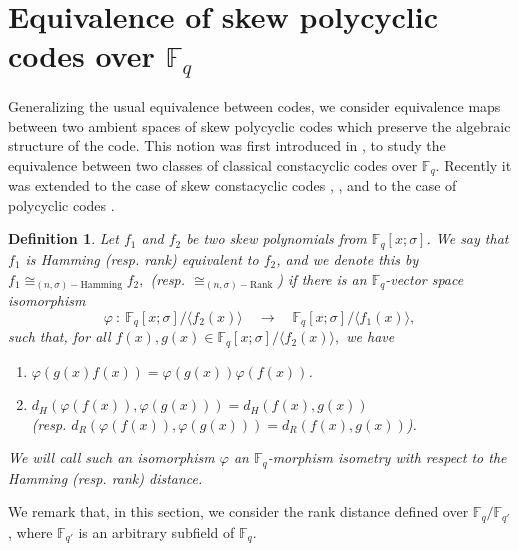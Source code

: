 \documentclass[12pt,paper]{article}
\theoremstyle{plain}
\newtheorem{definition}[theorem]{Definition}
\newcommand{\Fq}{\mathbb{F}_{q}}
\begin{document}
\section{Equivalence  of  skew  polycyclic codes over $\Fq$}

Generalizing the usual equivalence between codes, we consider equivalence maps between two ambient spaces of skew polycyclic codes which preserve the algebraic structure of the code. This notion was first introduced in \cite{Chen2012}, to study the equivalence between two classes of classical constacyclic  codes over $\Fq.$ Recently it was extended to the case of skew constacyclic codes \cite{Boulanouar2021,Ouazzou2025}, \cite[Section 6]{Lobillo2025},  and to the case of polycyclic codes \cite{Equiv2025, Chibloun2025polycyclic}.  

\begin{definition}\label{FqIso}  
Let $f_1$ and $f_2$ be two skew polynomials from $\mathbb{F}_q[x;\sigma]$. We say that $f_1$  is \emph{Hamming} (resp. \emph{rank}) \emph{equivalent} to $f_2$, and we denote this by $ f_1 \cong_{(n,\sigma)-\text{Hamming}} f_2, $ (resp. $\cong_{(n,\sigma)-\text{Rank}}$)  if there is an $\mathbb{F}_q$-vector space isomorphism 
$$\varphi ~:~  \mathbb{F}_q[x;\sigma] /\langle f_2(x)\rangle   \quad \longrightarrow  \quad  \mathbb{F}_q[x;\sigma] /\langle 
f_1(x)\rangle,$$
such that, for all $ f(x), g(x) \in \Fq[x;\sigma] /\langle f_2(x) \rangle,$ we have 
\begin{enumerate}  
    \item $\varphi(g(x)f(x))= \varphi(g(x)) \varphi(f(x)) $.  
    \item $d_H(\varphi(f(x)), \varphi(g(x)))=d_H(f(x), g(x))$ \\ (resp. $ d_R(\varphi(f(x)), \varphi(g(x)))=d_R(f(x), g(x))$).
\end{enumerate}  
We will call such an isomorphism $\varphi$ an \emph{$\mathbb{F}_q$-morphism isometry} with respect to the Hamming (resp. rank)   distance.
\end{definition}  

We remark that, in this section,  we consider the rank distance defined over $ \Fq/ \mathbb{F}_{q'}$, where $ \mathbb{F}_{q'} $ is an arbitrary subfield of $ \Fq.$
\end{document}
